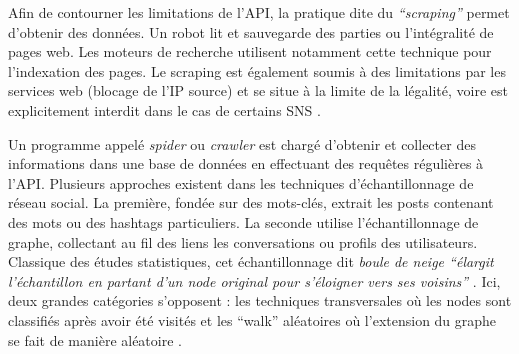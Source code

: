 Afin de contourner les limitations de l{\textquoteright}API, la pratique dite du \textit{{\textquotedblleft}scraping{\textquotedblright} }permet d{\textquoteright}obtenir des données. Un robot lit et sauvegarde des parties ou l{\textquoteright}intégralité de pages web. Les moteurs de recherche utilisent notamment cette technique pour l{\textquoteright}indexation des pages. Le scraping est également soumis à des limitations par les services web (blocage de l{\textquoteright}IP source) et se situe à la limite de la légalité, voire est explicitement interdit dans le cas de certains SNS \citep{Petschulat2010}.

Un programme appelé \textit{spider }ou \textit{crawler} est chargé d'obtenir et collecter des informations dans une base de données en effectuant des requ\^etes régulières à l{\textquoteright}API. Plusieurs approches existent dans les techniques d'échantillonnage de réseau social. La première, fondée sur des mots-clés, extrait les posts contenant des mots ou des hashtags particuliers. La seconde utilise l{\textquoteright}échantillonnage de graphe, collectant au fil des liens les conversations ou profils des utilisateurs. Classique des études statistiques, cet échantillonnage dit \textit{boule de neige {\textquotedblleft}élargit l{\textquoteright}échantillon en partant d{\textquoteright}un node original pour s{\textquoteright}éloigner vers ses voisins{\textquotedblright}} \citep{Rothenberg1995}. Ici, deux grandes catégories s{\textquoteright}opposent : les techniques transversales o\`u les nodes sont classifiés après avoir été visités et les {\textquotedblleft}walk{\textquotedblright} aléatoires o\`u l{\textquoteright}extension du graphe se fait de manière aléatoire \citep{Gjoka2011}.

